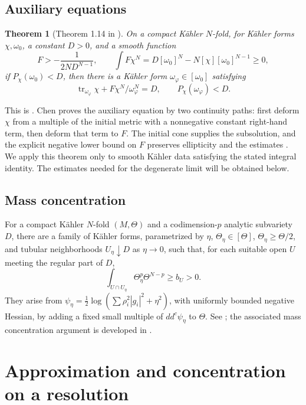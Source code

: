 \documentclass[reqno]{amsart}
\theoremstyle{remark}
\theoremstyle{plain}
\newtheorem{theorem}[thm]{Theorem}
\begin{document}
\subsection{Auxiliary equations}\label{sec:analytic-inputs}

\begin{theorem}[Theorem 1.14 in \cite{Chen21}]\label{thm-Chen}
    On a compact K\"ahler \(N\)-fold, for K\"ahler forms \(\chi,\omega_0\), a constant \(D>0\), and a smooth function
\[
F>-\frac1{2ND^{N-1}},\qquad
\int F\chi^N=D[\omega_0]^N-N[\chi][\omega_0]^{N-1}\ge0,
\]
if \(P_\chi(\omega_0)<D\), then there is a K\"ahler form \(\omega_\varphi\in[\omega_0]\) satisfying
\[
\operatorname{tr}_{\omega_\varphi}\chi+
F\chi^N/\omega_\varphi^N=D,\qquad P_\chi(\omega_\varphi)<D.
\]
\end{theorem} 
This is \cite[Theorem 1.14]{C21}. Chen proves the auxiliary equation by two continuity paths: first deform \(\chi\) from a multiple of the initial metric with a nonnegative constant right-hand term, then deform that term to \(F\). The initial cone supplies the subsolution, and the explicit negative lower bound on \(F\) preserves ellipticity and the estimates \cite[Section 2]{C21}. We apply this theorem only to smooth K\"ahler data satisfying the stated integral identity. The estimates needed for the degenerate limit will be obtained below.

\subsection{Mass concentration}\label{sec:mass-concentration} For a compact K\"ahler \(N\)-fold \((M,\Theta)\) and a codimension-\(p\) analytic subvariety \(D\), there are a family of K\"ahler forms, parametrized by $\eta$,  \(\Theta_\eta\in[\Theta]\), \(\Theta_\eta\ge\Theta/2\), and tubular neighborhoods \(U_\eta\downarrow D\) as $\eta\to 0$, such that, for each suitable open \(U\) meeting the regular part of \(D\),
\[
\int_{U\cap U_\eta}\Theta_\eta^p\Theta^{N-p}\ge b_U>0.
\]
They arise from \(\psi_\eta=\frac12\log(\sum\rho_i^2|g_i|^2+\eta^2)\), with uniformly bounded negative Hessian, by adding a fixed small multiple of \(dd^c\psi_\eta\) to \(\Theta\). See \cite[Lemma 2.1(iii)--(iv)]{DP}; the associated mass concentration argument is developed in \cite[Proposition 2.6]{DP}.



\section{Approximation and concentration on a resolution}
\end{document}
